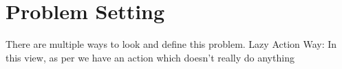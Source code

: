 \section{Problem Setting}
There are multiple ways to look and define this problem.
Lazy Action Way: In this view, as per \cite{jacq2022lazy} we have an action which doesn't really do anything